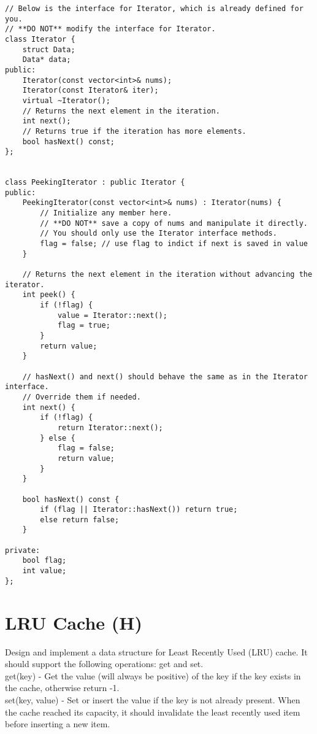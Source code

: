 \begin{lstlisting}
// Below is the interface for Iterator, which is already defined for you.
// **DO NOT** modify the interface for Iterator.
class Iterator {
    struct Data;
	Data* data;
public:
	Iterator(const vector<int>& nums);
	Iterator(const Iterator& iter);
	virtual ~Iterator();
	// Returns the next element in the iteration.
	int next();
	// Returns true if the iteration has more elements.
	bool hasNext() const;
};


class PeekingIterator : public Iterator {
public:
	PeekingIterator(const vector<int>& nums) : Iterator(nums) {
	    // Initialize any member here.
	    // **DO NOT** save a copy of nums and manipulate it directly.
	    // You should only use the Iterator interface methods.
	    flag = false; // use flag to indict if next is saved in value
	}

    // Returns the next element in the iteration without advancing the iterator.
	int peek() {
        if (!flag) {
            value = Iterator::next();
            flag = true;
        }
        return value;
	}

	// hasNext() and next() should behave the same as in the Iterator interface.
	// Override them if needed.
	int next() {
	    if (!flag) {
	        return Iterator::next();
	    } else {
    	    flag = false;
	        return value;
	    }
	}

	bool hasNext() const {
	    if (flag || Iterator::hasNext()) return true;
	    else return false;
	}
	
private:
    bool flag;
    int value;
};
\end{lstlisting}


\section{LRU Cache (H)}
Design and implement a data structure for Least Recently Used (LRU) cache. It should support the following operations: get and set.\\

get(key) - Get the value (will always be positive) of the key if the key exists in the cache, otherwise return -1.\\
set(key, value) - Set or insert the value if the key is not already present. When the cache reached its capacity, it should invalidate the least recently used item before inserting a new item. \\

